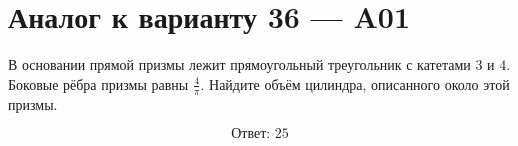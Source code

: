 \documentclass[12pt,a4paper]{article}
\begin{document}
\section*{Аналог к варианту 36 — A01}

В основании прямой призмы лежит прямоугольный треугольник с катетами \(3\) и \(4\). Боковые рёбра призмы равны \(\frac4\pi\). Найдите объём цилиндра, описанного около этой призмы.

\begin{center}
\end{center}

\[
\boxed{\text{Ответ: }25}
\]
\end{document}
